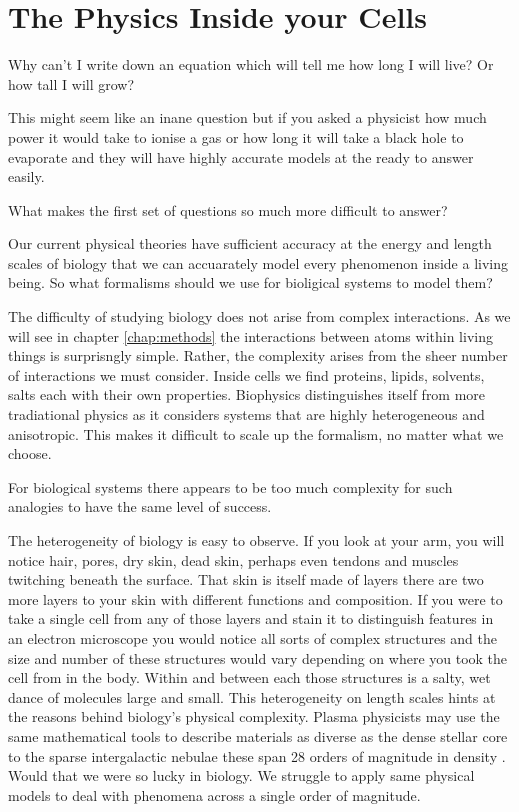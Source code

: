\section{The Physics Inside your Cells}

Why can't I  write down an equation which will tell me how long I will live? Or how tall I will grow?

This might seem like an inane question but if you asked a physicist how much power it would take to ionise a gas or how long it will take a black hole to evaporate and they will have highly accurate models at the ready to answer easily. 

What makes the first set of questions so much more difficult to answer?

Our current physical theories have sufficient accuracy at the energy and length scales of biology that we can accuarately model every phenomenon inside a living being\cite{carroll2021}. So what formalisms should we use for bioligical systems to model them?

The difficulty of studying biology does not arise from complex interactions. As we will see in chapter \ref{chap:methods} the interactions between atoms within living things is surprisngly simple. Rather, the complexity arises from the sheer number of interactions we must consider. Inside cells we find proteins, lipids, solvents, salts each with their own properties. Biophysics distinguishes itself from more tradiational physics as it considers systems that are highly heterogeneous and anisotropic. This makes it difficult to scale up the formalism, no matter what we choose.

For biological systems there appears to be too much complexity for such analogies to have the same level of success. 

The heterogeneity of biology is easy to observe. If you look at your arm, you will notice hair, pores, dry skin, dead skin, perhaps even tendons and muscles twitching beneath the surface. That skin is itself made of layers there are two more layers to your skin with different functions and composition. If you were to take a single cell from any of those layers and stain it to distinguish features in an electron microscope you would notice all sorts of complex structures and the size and number of these structures would vary depending on where you took the cell from in the body. Within and between each those structures is a salty, wet dance of molecules large and small. This heterogeneity on length scales hints at the reasons behind biology's physical complexity. Plasma physicists may use the same mathematical tools to describe materials as diverse as the dense stellar core to the sparse intergalactic nebulae these span 28 orders of magnitude in density \cite{chen2018}. Would that we were so lucky in biology. We struggle to apply same physical models to deal with phenomena across a single order of magnitude.  

